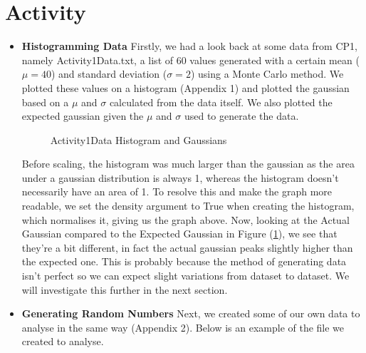 \documentclass[12pt]{article}
\begin{document}
    \section{Activity}
    \begin{itemize}
        \item \textbf{Histogramming Data}\newline
        Firstly, we had a look back at some data from CP1, namely Activity1Data.txt, a list 
        of 60 values generated with a certain mean ($\mu=40$) and standard deviation ($\sigma=2$) 
        using a Monte Carlo method. We plotted these values on a histogram (Appendix 1) and plotted 
        the gaussian based on a $\mu$ and $\sigma$ calculated from the data itself. We also plotted 
        the expected gaussian given the $\mu$ and $\sigma$ used to generate the data. 
        
        \begin{figure}[H]
            \begin{center}
                \scalebox{.7}{}
                \caption{Activity1Data Histogram and Gaussians}
                \label{fig:Activity1DataHist}
            \end{center}
        \end{figure}
        
        \noindent
        Before scaling, the histogram was much larger than the gaussian as the area under a gaussian 
        distribution is always 1, whereas the histogram doesn't necessarily have an area of 1. To 
        resolve this and make the graph more readable, we set the density argument to True when 
        creating the histogram, which normalises it, giving us the graph above. 
        \newline
        Now, looking at the Actual Gaussian compared to the Expected Gaussian in Figure 
        (\ref{fig:Activity1DataHist}), we see that they're a bit different, in fact the actual 
        gaussian peaks slightly higher than the expected one. This is probably because the method 
        of generating data isn't perfect so we can expect slight variations from dataset to dataset. 
        We will investigate this further in the next section.

        \item \textbf{Generating Random Numbers}\newline
        Next, we created some of our own data to analyse in the same way (Appendix 2). Below is an 
        example of the file we created to analyse.
        \newline
        
        

\end{itemize}
\end{document}
